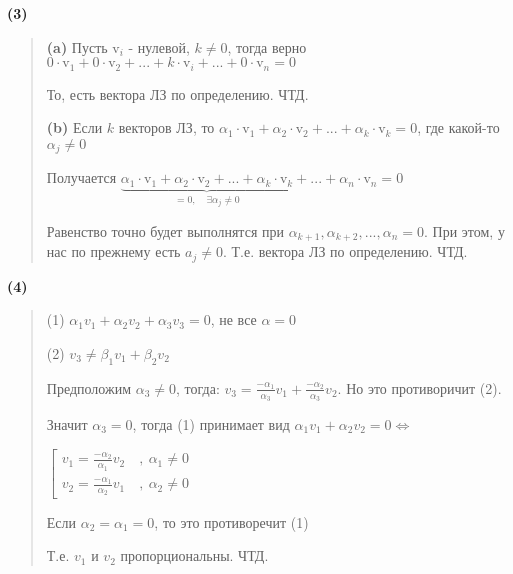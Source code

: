 \documentclass{article}
\begin{document}
\textbf{\textsf{(3)}}
\begin{quote}
   \textbf{(a)} Пусть $\text{v}_i$ - нулевой, $k \not= 0$, тогда верно $0 \cdot \text{v}_1 + 0 \cdot \text{v}_2 + ... 
   + k \cdot \text{v}_i + ... + 0 \cdot \text{v}_n = 0$

   То, есть вектора ЛЗ по определению. ЧТД.

   \textbf{(b)} Если $k$ векторов ЛЗ, то $\alpha_1 \cdot \text{v}_1 + \alpha_2 \cdot \text{v}_2 + ... 
   + \alpha_k \cdot \text{v}_k = 0$, где какой-то $\alpha_j \not = 0$

   Получается
   $\underbrace{\alpha_1 \cdot \text{v}_1 + \alpha_2 \cdot \text{v}_2 + ... 
   + \alpha_k \cdot \text{v}_k}_{= 0, \quad \exists \alpha_j \not = 0} + ... + \alpha_n \cdot \text{v}_n = 0$

   Равенство точно будет выполнятся при $\alpha_{k + 1}, \alpha_{k + 2} , ... ,\alpha_n = 0$. При этом, у нас по прежнему есть $a_j \not = 0$.
   Т.е. вектора ЛЗ по определению. ЧТД.


\end{quote}

\textbf{\textsf{(4)}}
\begin{quote}
    (1) $\alpha_1 v_1 + \alpha_2 v_2 + \alpha_3 v_3 = 0$, не все $\alpha = 0$
    
    (2) $v_3 \not = \beta_1 v_1 + \beta_2 v_2$
    
    Предположим $\alpha_3 \not = 0$, тогда: $v_3 = \frac{-\alpha_1}{\alpha_3}v_1 + \frac{-\alpha_2}{\alpha_3}v_2$.
    Но это противоричит (2). 
    
    Значит $\alpha_3 = 0$, тогда (1) принимает вид $\alpha_1 v_1 + \alpha_2 v_2 = 0 \Leftrightarrow $
    
    $
    \left[\begin{gathered}
    v_1 = \frac{-\alpha_2}{\alpha_1} v_2 \quad , \ \alpha_1 \not = 0 \\
    v_2 = \frac{-\alpha_1}{\alpha_2} v_1 \quad , \ \alpha_2 \not = 0
    \end{gathered}
    \right. 
    $ 

    Если $\alpha_2 = \alpha_1 = 0$, то это противоречит (1)
    
    Т.е. $v_1$ и $v_2$ пропорциональны. ЧТД. 
    
\end{quote}
\end{document}
